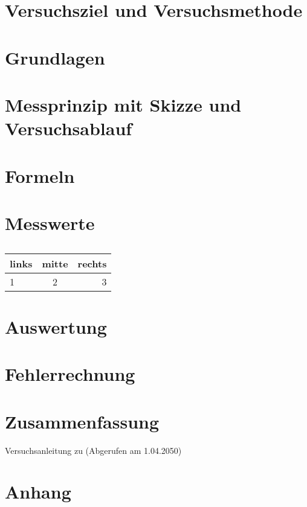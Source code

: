 \documentclass[
12pt,
a4paper,
bibliography=totocnumbered, %
twoside, %
BCOR=1cm, %
]{scrartcl}
\numberwithin{equation}{section} %
\begin{document}
\renewcommand{\thepage}{\arabic{page}}
\setcounter{page}{1}


\section[Versuchsziel]{Versuchsziel und Versuchsmethode}



\section{Grundlagen}




\section[Messprinzip]{Messprinzip mit Skizze und Versuchsablauf}



\section[Formeln]{Formeln}




\section{Messwerte}

\begin{table}[htb]
		\caption{}
		\centering
		\begin{tabular}{|l||c|r}
			\hline
			links & mitte & rechts \\
			\hline
			\hline
			1 & 2 & 3 \\
			\hline
		\end{tabular}
		\label{tab:Tabelle1}
\end{table}

\section{Auswertung}


\section{Fehlerrechnung}


\section{Zusammenfassung}


\begin{thebibliography}{999}
	 Versuchsanleitung zu (Abgerufen am 1.04.2050)
\end{thebibliography}


\section{Anhang}
%
\end{document}
